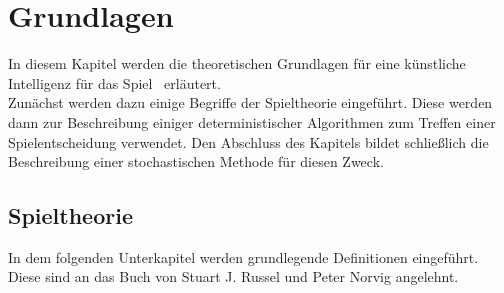 \chapter{Grundlagen}
\label{basics}
In diesem Kapitel werden die theoretischen Grundlagen für eine künstliche Intelligenz für das Spiel \ot\ erläutert.\\
Zunächst werden dazu einige Begriffe der Spieltheorie eingeführt. Diese werden dann zur Beschreibung einiger deterministischer Algorithmen zum Treffen einer Spielentscheidung verwendet. Den Abschluss des Kapitels bildet schließlich die Beschreibung einer stochastischen Methode für diesen Zweck. 
\section{Spieltheorie}
In dem folgenden Unterkapitel werden grundlegende Definitionen eingeführt. Diese sind an das Buch  von Stuart J. Russel und Peter Norvig \cite{Russell.2016} angelehnt.

